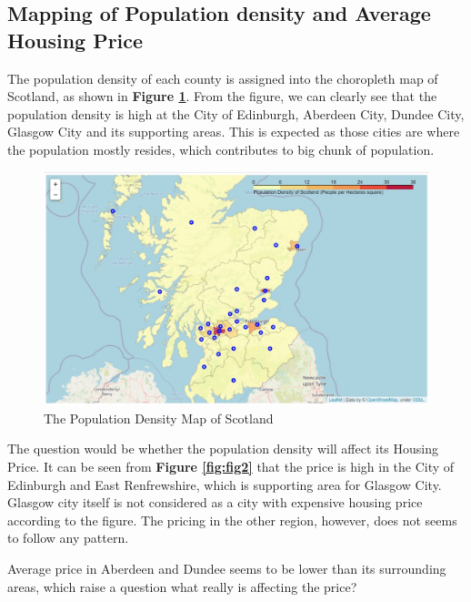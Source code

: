 \documentclass{homeworg}
\begin{document}
\subsection{Mapping of Population density and Average Housing Price}
The population density of each county is assigned into the choropleth map of Scotland, as shown in \textbf{Figure \ref{fig:fig1}}. From the figure, we can clearly see that the population density is high at the City of Edinburgh, Aberdeen City, Dundee City, Glasgow City and its supporting areas. This is expected as those cities are where the population mostly resides, which contributes to big chunk of population. \par
\begin{figure}[!h]
    \centering
    \includegraphics[scale=0.7]{figure/Figure_1_Populat_on_Density_Map.jpg}
    \caption{The Population Density Map of Scotland}
    \label{fig:fig1}
\end{figure}
\FloatBarrier
The question would be whether the population density will affect its Housing Price. It can be seen from \textbf{Figure \ref{fig:fig2}} that the price is high in the City of Edinburgh and East Renfrewshire, which is supporting area for Glasgow City. Glasgow city itself is not considered as a city with expensive housing price according to the figure. The pricing in the other region, however, does not seems to follow any pattern. \par
Average price in Aberdeen and Dundee seems to be lower than its surrounding areas, which raise a question what really is affecting the price?
\end{document}
